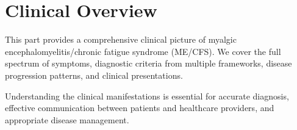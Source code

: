 \part{Clinical Overview}
\label{part:clinical}

This part provides a comprehensive clinical picture of myalgic encephalomyelitis/chronic fatigue syndrome (ME/CFS). We cover the full spectrum of symptoms, diagnostic criteria from multiple frameworks, disease progression patterns, and clinical presentations.

Understanding the clinical manifestations is essential for accurate diagnosis, effective communication between patients and healthcare providers, and appropriate disease management.

